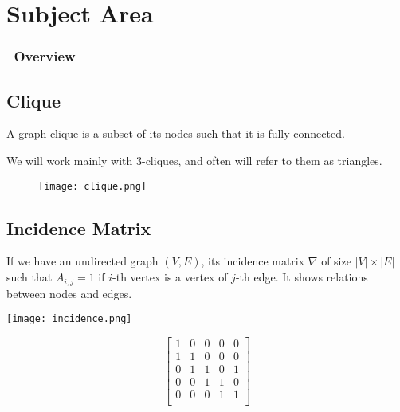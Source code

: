 \section{Subject Area}

\begin{frame}
   \frametitle{\secname\ Overview}
   \tableofcontents[currentsection]
\end{frame}

\subsection{Clique}
\begin{frame}{\subsecname}
   A graph clique is a subset of its nodes such that it is fully connected.

   We will work mainly with 3-cliques, and often will refer to them as triangles.

   \begin{figure}[H]
       \centering
       \texttt{[image: clique.png]}
   \end{figure}
\end{frame}

\subsection{Incidence Matrix}
\begin{frame}{\subsecname}
   If we have an undirected graph $(V, E)$, its incidence matrix $\nabla$ of size $\lvert V \rvert \times \lvert E \rvert$ such that $A_{i, j} = 1$ if $i$-th vertex is a vertex of $j$-th edge.
   It shows relations between nodes and edges.

   \begin{multicols}{2}
       \texttt{[image: incidence.png]}

       \[
           \begin{bmatrix}
               1 & 0 & 0 & 0 & 0 \\
               1 & 1 & 0 & 0 & 0 \\
               0 & 1 & 1 & 0 & 1 \\
               0 & 0 & 1 & 1 & 0 \\
               0 & 0 & 0 & 1 & 1 \\
           \end{bmatrix}
       \]

   \end{multicols}
\end{frame}

